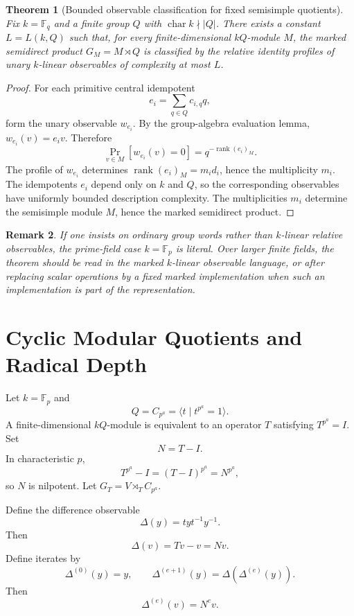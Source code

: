\documentclass[11pt]{article}
\newtheorem{theorem}{Theorem}[section]
\newtheorem{remark}[theorem]{Remark}
\begin{document}
\begin{theorem}[Bounded observable classification for fixed semisimple quotients]
Fix $k=\mathbb F_q$ and a finite group $Q$ with $\operatorname{char}k\nmid |Q|$. There exists a constant $L=L(k,Q)$ such that, for every finite-dimensional $kQ$-module $M$, the marked semidirect product $G_M=M\rtimes Q$ is classified by the relative identity profiles of unary $k$-linear observables of complexity at most $L$.
\end{theorem}

\begin{proof}
For each primitive central idempotent
\[
e_i=\sum_{q\in Q}c_{i,q}q,
\]
form the unary observable $w_{e_i}$. By the group-algebra evaluation lemma, $w_{e_i}(v)=e_iv$. Therefore
\[
\Pr_{v\in M}[w_{e_i}(v)=0]
=
q^{-\operatorname{rank}(e_i)_M}.
\]
The profile of $w_{e_i}$ determines $\operatorname{rank}(e_i)_M=m_i d_i$, hence the multiplicity $m_i$. The idempotents $e_i$ depend only on $k$ and $Q$, so the corresponding observables have uniformly bounded description complexity. The multiplicities $m_i$ determine the semisimple module $M$, hence the marked semidirect product.
\end{proof}

\begin{remark}
If one insists on ordinary group words rather than $k$-linear relative observables, the prime-field case $k=\mathbb F_p$ is literal. Over larger finite fields, the theorem should be read in the marked $k$-linear observable language, or after replacing scalar operations by a fixed marked implementation when such an implementation is part of the representation.
\end{remark}

\section{Cyclic Modular Quotients and Radical Depth}

Let $k=\mathbb F_p$ and
\[
Q=C_{p^a}=\langle t\mid t^{p^a}=1\rangle.
\]
A finite-dimensional $kQ$-module is equivalent to an operator $T$ satisfying $T^{p^a}=I$. Set
\[
N=T-I.
\]
In characteristic $p$,
\[
T^{p^a}-I=(T-I)^{p^a}=N^{p^a},
\]
so $N$ is nilpotent. Let $G_T=V\rtimes_T C_{p^a}$.

Define the difference observable
\[
\Delta(y)=tyt^{-1}y^{-1}.
\]
Then
\[
\Delta(v)=Tv-v=Nv.
\]
Define iterates by
\[
\Delta^{(0)}(y)=y,
\qquad
\Delta^{(e+1)}(y)=\Delta(\Delta^{(e)}(y)).
\]
Then
\[
\Delta^{(e)}(v)=N^e v.
\]
\end{document}
